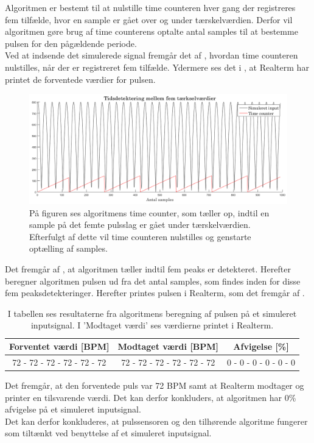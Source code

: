 Algoritmen er bestemt til at nulstille time counteren hver gang der registreres fem tilfælde, hvor en sample er gået over og under tærskelværdien. Derfor vil algoritmen gøre brug af time counterens optalte antal samples til at bestemme pulsen for den pågældende periode. \\
Ved at indsende det simulerede signal fremgår det af , hvordan time counteren nulstilles, når der er registreret fem tilfælde. Ydermere ses det i , at Realterm har printet de forventede værdier for pulsen.
\begin{figure}[H]
	\centering
	\includegraphics[scale=0.34]{figures/cDesign/timecounter_puls_pic.png}
	\caption{På figuren ses algoritmens time counter, som tæller op, indtil en sample på det femte pulsslag er gået under tærskelværdien. Efterfulgt af dette vil time counteren nulstilles og genstarte optælling af samples.}
	\label{fig:timecounter_puls_realterm}
\end{figure}\vspace{-.25cm}
Det fremgår af , at algoritmen tæller indtil fem peaks er detekteret. Herefter beregner algoritmen pulsen ud fra det antal samples, som findes inden for disse fem peaksdetekteringer. Herefter printes pulsen i Realterm, som det fremgår af .
\begin{table}[H]
	\centering
	\begin{tabular}{ccc}
		\hline
		\rowcolor[HTML]{C0C0C0} 
		Forventet værdi [BPM] & Modtaget værdi [BPM] & Afvigelse [\%]\\ \hline
		72 - 72 - 72 - 72 - 72 - 72         & 72 - 72 - 72 - 72 - 72 - 72         & 0 - 0 - 0 - 0 - 0 - 0 \\ \hline
	\end{tabular}
	\caption{I tabellen ses resultaterne fra algoritmens beregning af pulsen på et simuleret inputsignal. I 'Modtaget værdi' ses værdierne printet i Realterm.}
	\label{tab:test_puls_realterm}
\end{table} \vspace{-.25cm}
Det fremgår, at den forventede puls var 72 BPM samt at Realterm modtager og printer en tilsvarende værdi. Det kan derfor konkluders, at algoritmen har 0\% afvigelse på et simuleret inputsignal. \\
Det kan derfor konkluderes, at pulssensoren og den tilhørende algoritme fungerer som tiltænkt ved benyttelse af et simuleret inputsignal. 

